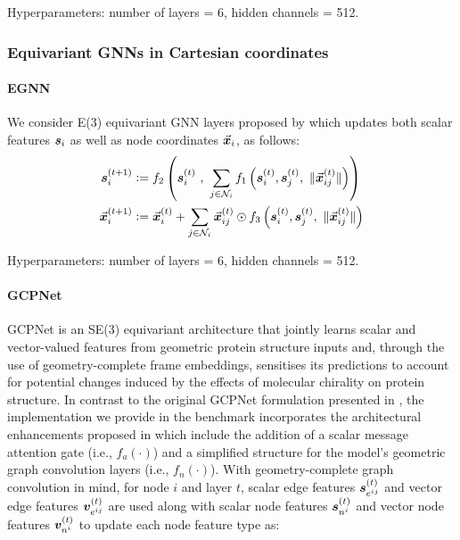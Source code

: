 Hyperparameters: number of layers = 6, hidden channels = 512.

\subsubsection{Equivariant GNNs in Cartesian coordinates}

\paragraph{EGNN \citep{satorras2021n}}
We consider E(3) equivariant GNN layers proposed by \citet{satorras2021n} which updates both scalar features ${\bm{s}}_i$ as well as node coordinates $\vec{{\bm{x}}}_{i}$, as follows:
\begin{align}
    {\bm{s}}_i^{(t+1)} & \vcentcolon= f_2 \left( {\bm{s}}_i^{(t)} \ , \ \sum_{j \in \mathcal{N}_i} f_1 \left( {\bm{s}}_i^{(t)} , {\bm{s}}_j^{(t)} , \ \Vert \vec{{\bm{x}}}_{ij}^{(t)} \Vert \right) \right)      \\
    \vec{{\bm{x}}}_i^{(t+1)} & \vcentcolon= \vec{{\bm{x}}}_i^{(t)} + \sum_{j \in \mathcal{N}_i} \vec{{\bm{x}}}_{ij}^{(t)} \odot f_3 \left( {\bm{s}}_i^{(t)} , {\bm{s}}_j^{(t)} , \ \Vert \vec{{\bm{x}}}_{ij}^{(t)} \Vert \right)
\end{align}

Hyperparameters: number of layers = 6, hidden channels = 512.

\paragraph{GCPNet \citep{morehead2024geometry}}
GCPNet is an SE(3) equivariant architecture that jointly learns scalar and vector-valued features from geometric protein structure inputs and, through the use of geometry-complete frame embeddings, sensitises its predictions to account for potential changes induced by the effects of molecular chirality on protein structure. In contrast to the original GCPNet formulation presented in \citet{morehead2024geometry}, the implementation we provide in the benchmark incorporates the architectural enhancements proposed in \citet{morehead2023geometry} which include the addition of a scalar message attention gate (i.e., $f_{a}(\cdot)$) and a simplified structure for the model's geometric graph convolution layers (i.e., $f_{n}(\cdot)$). With geometry-complete graph convolution in mind, for node $i$ and layer $t$, scalar edge features ${\bm{s}}_{e^{ij}}^{(t)}$ and vector edge features ${\bm{v}}_{e^{ij}}^{(t)}$ are used along with scalar node features ${\bm{s}}_{n^{i}}^{(t)}$ and vector node features ${\bm{v}}_{n^{i}}^{(t)}$ to update each node feature type as:


